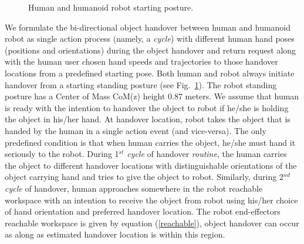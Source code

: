 \begin{figure}[htbp]
	\caption{Human and humanoid robot starting posture.}
	\label{fig:halfsit}
\end{figure}

We formulate the bi-directional object handover between human and humanoid robot as single action process (namely, a \textit{cycle}) with different human hand poses (positions and orientations) during the object handover and return request along with the human user chosen hand speeds and trajectories to those handover locations from a predefined starting pose. Both human and robot always initiate handover from a starting standing posture (see Fig.~\ref{fig:halfsit}). The robot standing posture has a Center of Mass CoM(z) height $0.87$ meters. We assume that human is ready with the intention to handover the object to robot if he/she is holding the object in his/her hand. At handover location, robot takes the object that is handed by the human in a single action event (and vice-versa). The only predefined condition is that when human carries the object, he/she must hand it seriously to the robot. During 1$^{st}$ \textit{cycle} of handover \textit{routine}, the human carries the object to different handover locations with distinguishable orientations of the object carrying hand and tries to give the object to robot. Similarly, during 2$^{nd}$ \textit{cycle} of handover, human approaches somewhere in the robot reachable workspace with an intention to receive the object from robot using his/her choice of hand orientation and preferred handover location. The robot end-effectors reachable workspace is given by equation (\ref{reachable}), object handover can occur as along as estimated handover location is within this region.

